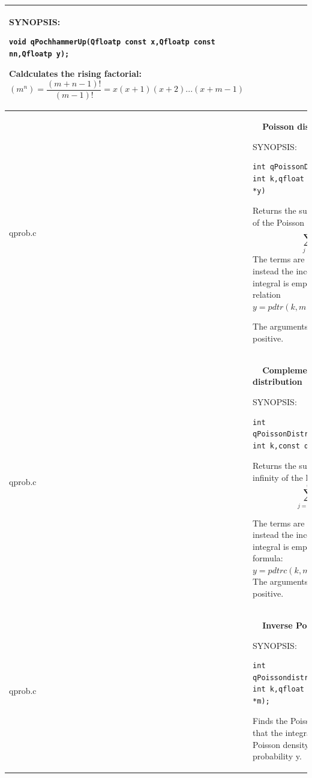 \documentclass[10pt,a4paper,x11names]{memoir} %
\newcounter{entry}
\newcommand{\TOC}[1] {\addcontentsline{toc}{section}{\theentry\ \  #1} \textbf{\theentry\ \  #1} \par\stepcounter{entry}}
\begin{document}
\begin{longtable}{|p{1.5cm}|p{11.5cm}|}
{\footnotesize SYNOPSIS:}\vspace{-0.2cm}\index{qPochhammerUp}
\begin{lstlisting}[numbers=none]
 void qPochhammerUp(Qfloatp const x,Qfloatp const nn,Qfloatp y);
\end{lstlisting}

Caldculates the rising factorial:
$$ (m^n)=\frac{(m+n-1)!}{(m-1)!} = x(x+1)(x+2)...(x+m-1)$$
\\\hline
	qprob.c&  \TOC{Poisson distribution}
	
	{\footnotesize SYNOPSIS:}\vspace{-0.2cm}\index{qPoissonDistribution}
	\begin{lstlisting}[numbers=none]
int qPoissonDistribution(const int k,qfloat *const m, qfloat *y)
	\end{lstlisting}\vspace{-0.2cm}
	Returns the sum of the first k terms of the Poisson
	distribution:
	$$\sum_{j=0}^{k} e^{-m}\frac{m^j}{j!}$$
	The terms are not summed directly; instead the incomplete
	gamma integral is employed, according to the relation
	$ y = pdtr( k, m ) = igamc( k+1, m )$
	
	The arguments must both be positive.
	\\\hline
	qprob.c& \TOC{Complemented poisson distribution}
	
	{\footnotesize SYNOPSIS:}\vspace{-0.2cm}\index{qPoissonDistributionComp}
	\begin{lstlisting}[numbers=none]
int qPoissonDistributionComp(const int k,const qfloat *m,qfloat *y)
	\end{lstlisting}\vspace{-0.2cm}
	Returns the sum of the terms k+1 to infinity of the Poisson
	distribution:
	$$\sum_{j=k+1}^{\infty} e^{-m}\frac{m^j}{j!}$$
	
	The terms are not summed directly; instead the incomplete
	gamma integral is employed, according to the formula:
	$y = pdtrc( k, m ) = igam( k+1, m )$
	The arguments must both be positive.
	\\\hline
	qprob.c&\TOC{Inverse Poisson distribution}
	
	{\footnotesize SYNOPSIS:}\vspace{-0.2cm}\index{qPoissondistributionInv}
	\begin{lstlisting}[numbers=none]
int qPoissondistributionInv(const int k,qfloat *const y,qfloat *m);
	\end{lstlisting}\vspace{-0.2cm}
	Finds the Poisson variable x such that the integral
	from 0 to x of the Poisson density is equal to the
	given probability y.
	

\end{longtable}
\end{document}
